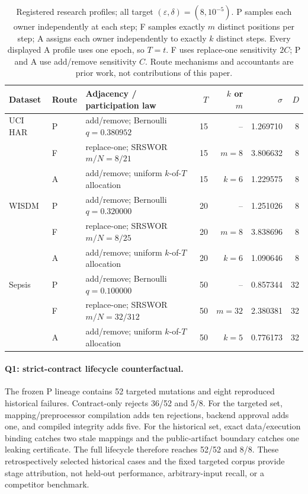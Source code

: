 \documentclass[letterpaper]{article}
\begin{document}
\begin{table}[t]
\centering
\small
\setlength{\tabcolsep}{4pt}
\begin{tabular}{@{}lllrrrr@{}}
\toprule
Dataset & Route & Adjacency / participation law & $T$ & $k$ or $m$ & $\sigma$ & $D$ \\
\midrule
UCI HAR & P & add/remove; Bernoulli $q=0.380952$ & 15 & -- & 1.269710 & 8 \\
 & F & replace-one; SRSWOR $m/N=8/21$ & 15 & $m=8$ & 3.806632 & 8 \\
 & A & add/remove; uniform $k$-of-$T$ allocation & 15 & $k=6$ & 1.229575 & 8 \\
\addlinespace[1pt]
WISDM & P & add/remove; Bernoulli $q=0.320000$ & 20 & -- & 1.251026 & 8 \\
 & F & replace-one; SRSWOR $m/N=8/25$ & 20 & $m=8$ & 3.838696 & 8 \\
 & A & add/remove; uniform $k$-of-$T$ allocation & 20 & $k=6$ & 1.090646 & 8 \\
\addlinespace[1pt]
Sepsis & P & add/remove; Bernoulli $q=0.100000$ & 50 & -- & 0.857344 & 32 \\
 & F & replace-one; SRSWOR $m/N=32/312$ & 50 & $m=32$ & 2.380381 & 32 \\
 & A & add/remove; uniform $k$-of-$T$ allocation & 50 & $k=5$ & 0.776173 & 32 \\
\bottomrule
\end{tabular}
\caption{Registered research profiles; all target
$(\varepsilon,\delta)=(8,10^{-5})$.  P samples each owner independently at
each step; F samples exactly $m$ distinct positions per step; A assigns each
owner independently to exactly $k$ distinct steps.  Every displayed A profile
uses one epoch, so $T=t$.  F uses replace-one
sensitivity $2C$; P and A use add/remove sensitivity $C$.  Route mechanisms
and accountants are prior work, not contributions of this paper.}
\label{tab:v38-profiles}
\end{table}

\paragraph{Q1: strict-contract lifecycle counterfactual.}
The frozen P lineage contains 52 targeted mutations and eight reproduced
historical failures.  Contract-only rejects 36/52 and 5/8.  For the targeted
set, mapping/preprocessor compilation adds ten rejections, backend approval
adds one, and compiled integrity adds five.  For the historical set, exact
data/execution binding catches two stale mappings and the public-artifact
boundary catches one leaking certificate.  The full lifecycle therefore
reaches 52/52 and 8/8.  These retrospectively selected historical cases and the
fixed targeted corpus provide stage attribution, not held-out performance,
arbitrary-input recall, or a competitor benchmark.
\end{document}
